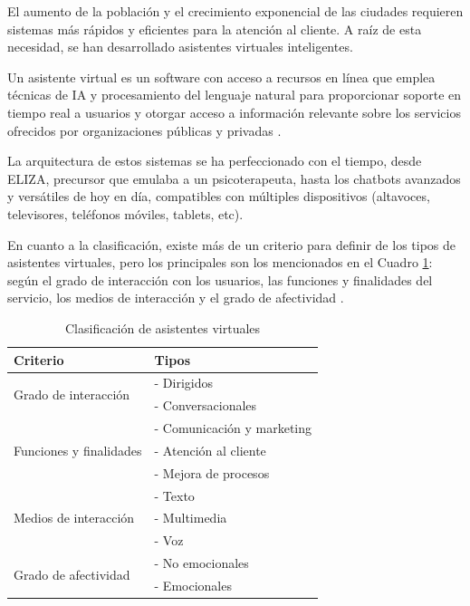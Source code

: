 El aumento de la población y el crecimiento exponencial de las ciudades requieren sistemas más rápidos y eficientes para la atención al cliente. A raíz de esta necesidad, se han desarrollado asistentes virtuales inteligentes.

Un asistente virtual es un software con acceso a recursos en línea que emplea técnicas de IA y procesamiento del lenguaje natural para proporcionar soporte en tiempo real a usuarios y otorgar acceso a información relevante sobre los servicios ofrecidos por organizaciones públicas y privadas \parencite{tfgAlexa1}.

La arquitectura de estos sistemas se ha perfeccionado con el tiempo, desde ELIZA, precursor que emulaba a un psicoterapeuta, hasta los chatbots avanzados y versátiles de hoy en día, compatibles con múltiples dispositivos (altavoces, televisores, teléfonos móviles, tablets, etc).

En cuanto a la clasificación, existe más de un criterio para definir de los tipos de asistentes virtuales, pero los principales son los mencionados en el Cuadro \ref{tab:criterios_asistentes_virtuales}: según el grado de interacción con los usuarios, las funciones y finalidades del servicio, los medios de interacción y el grado de afectividad \parencite{asistentesConv}.

\begin{table}[H]
    \centering
    \begin{tabular}{|l|l|}
    \hline
    \rowcolor{lightgray}
    \textbf{Criterio} & \textbf{Tipos} \\
    \hline
    \multirow{2}{*}{Grado de interacción} & - Dirigidos \\
     & - Conversacionales \\
    \hline
    \multirow{3}{*}{Funciones y finalidades} & - Comunicación y marketing \\
     & - Atención al cliente \\
     & - Mejora de procesos \\
    \hline
    \multirow{3}{*}{Medios de interacción} & - Texto \\
     & - Multimedia \\
     & - Voz \\
    \hline
    \multirow{2}{*}{Grado de afectividad} & - No emocionales \\
     & - Emocionales \\
    \hline
    \end{tabular}
    \caption{Clasificación de asistentes virtuales}
    \label{tab:criterios_asistentes_virtuales}
\end{table}

